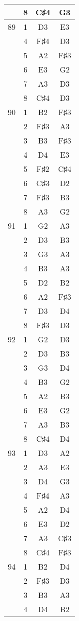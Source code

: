 \documentclass{article}
\begin{document}
\begin{longtable}{|c|c|c|c|}
  & 8 & C♯4 & G3 \\ 
\hline
89 & 1 & D3 & E3 \\ 
  & 4 & F♯4 & D3 \\ 
  & 5 & A2 & F♯3 \\ 
  & 6 & E3 & G2 \\ 
  & 7 & A3 & D3 \\ 
  & 8 & C♯4 & D3 \\ 
\hline
90 & 1 & B2 & F♯3 \\ 
  & 2 & F♯3 & A3 \\ 
  & 3 & B3 & F♯3 \\ 
  & 4 & D4 & E3 \\ 
  & 5 & F♯2 & C♯4 \\ 
  & 6 & C♯3 & D2 \\ 
  & 7 & F♯3 & B3 \\ 
  & 8 & A3 & G2 \\ 
\hline
91 & 1 & G2 & A3 \\ 
  & 2 & D3 & B3 \\ 
  & 3 & G3 & A3 \\ 
  & 4 & B3 & A3 \\ 
  & 5 & D2 & B2 \\ 
  & 6 & A2 & F♯3 \\ 
  & 7 & D3 & D4 \\ 
  & 8 & F♯3 & D3 \\ 
\hline
92 & 1 & G2 & D3 \\ 
  & 2 & D3 & B3 \\ 
  & 3 & G3 & D4 \\ 
  & 4 & B3 & G2 \\ 
  & 5 & A2 & B3 \\ 
  & 6 & E3 & G2 \\ 
  & 7 & A3 & B3 \\ 
  & 8 & C♯4 & D4 \\ 
\hline
93 & 1 & D3 & A2 \\ 
  & 2 & A3 & E3 \\ 
  & 3 & D4 & G3 \\ 
  & 4 & F♯4 & A3 \\ 
  & 5 & A2 & D4 \\ 
  & 6 & E3 & D2 \\ 
  & 7 & A3 & C♯3 \\ 
  & 8 & C♯4 & F♯3 \\ 
\hline
94 & 1 & B2 & D4 \\ 
  & 2 & F♯3 & D3 \\ 
  & 3 & B3 & A3 \\ 
  & 4 & D4 & B2 \\ 

\end{longtable}
\end{document}
